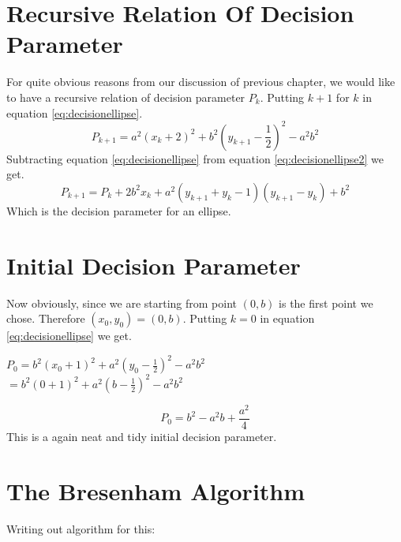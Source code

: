 \documentclass[a4paper,12pt,oneside]{book}
\begin{document}
\section{Recursive Relation Of Decision Parameter}
For quite obvious reasons from our discussion of previous chapter, we would like to have a recursive relation of decision parameter $P_k$. Putting $k+1$ for $k$ in equation \ref{eq:decisionellipse}.
\begin{equation} \label{eq:decisionellipse2}
	P_{k+1}=a^2(x_k+2)^2+b^2(y_{k+1}-\frac{1}{2})^2-a^2b^2
\end{equation}
Subtracting equation \ref{eq:decisionellipse} from equation \ref{eq:decisionellipse2} we get.
\begin{equation} \label{eq:ellipserecursivep}
	P_{k+1}=P_k+2b^2x_k+a^2(y_{k+1}+y_k-1)(y_{k+1}-y_k)+b^2
\end{equation}
 Which is the decision parameter for an ellipse.
 \section{Initial Decision Parameter}
 Now obviously, since we are starting from point  $(0,b)$ is the first point we chose. Therefore $(x_0,y_0)=(0,b)$. Putting $k=0$ in equation \ref{eq:decisionellipse} we get.
 \begin{center}
 	$P_0=b^2(x_0+1)^2+a^2(y_0-\frac{1}{2})^2-a^2b^2$\\
	$=b^2(0+1)^2+a^2(b-\frac{1}{2})^2-a^2b^2$ 	
 \end{center}
 \begin{equation} \label{eq:p0ellipse}
	P_0=b^2-a^2b+\frac{a^2}{4}
 \end{equation}
 This is a again neat and tidy initial decision parameter.\\

 \section{The Bresenham Algorithm}
Writing out algorithm for this:
\end{document}

